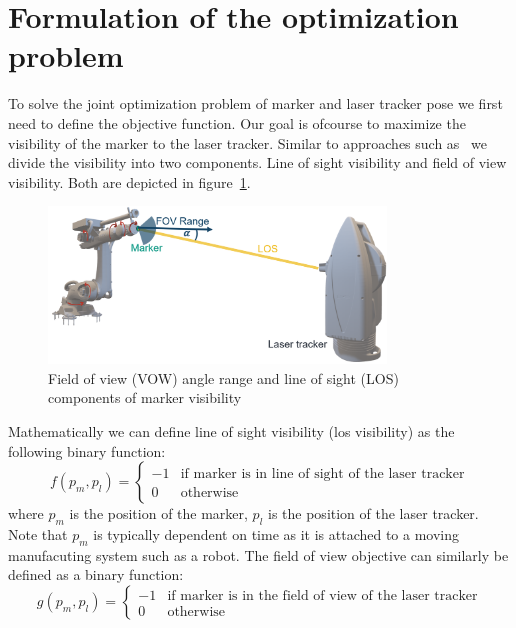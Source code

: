 \documentclass{svproc}
\begin{document}
\section{Formulation of the optimization problem}
To solve the joint optimization problem of marker and laser tracker pose we first need to define the objective function.
Our goal is ofcourse to maximize the visibility of the marker to the laser tracker.
Similar to approaches such as~\cite{ieee_sensors} we divide the visibility into two components.
Line of sight visibility and field of view visibility.
Both  are depicted in figure~\ref{fig:visibility}.
\begin{figure}
        \centering
        \includegraphics[width=0.8\textwidth]{figures/visibility.png}
        \caption{Field of view (VOW) angle range and line of sight (LOS) components of marker visibility}
        \label{fig:visibility}
\end{figure}
Mathematically we can define line of sight visibility (los visibility) as the following binary function:
\begin{equation}
    f(p_m,p_l) = \begin{cases}
    -1 & \text{if } \text{marker is in line of sight of the laser tracker} \\
    0 & \text{otherwise}
    \end{cases}
\end{equation}
where $p_m$ is the position of the marker, $p_l$ is the position of the laser tracker.
Note that $p_m$ is typically dependent on time as it is attached to a moving manufacuting system such as a robot.
The field of view objective can similarly be defined as a binary function:
\begin{equation}
    g(p_m,p_l) = \begin{cases}
    -1 & \text{if } \text{marker is in the field of view of the laser tracker} \\
    0 & \text{otherwise}
    \end{cases}
\end{equation}
\end{document}
